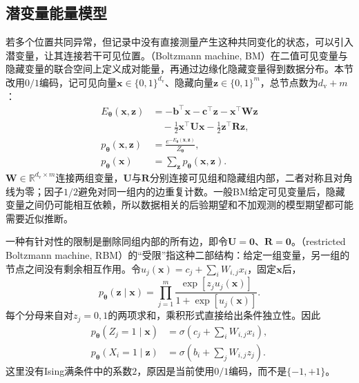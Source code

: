 \subsection{潜变量能量模型}
\label{sec:pgm-energy-models-latent}

若多个位置共同异常，但记录中没有直接测量产生这种共同变化的状态，可以引入潜变量，让其连接若干可见位置。（Boltzmann machine, BM）在二值可见变量与隐藏变量的联合空间上定义成对能量，再通过边缘化隐藏变量得到数据分布。本节改用$0/1$编码，记可见向量$\bm{x}\in\{0,1\}^{d_{\mathrm{v}}}$、隐藏向量$\bm{z}\in\{0,1\}^m$，总节点数为$d_{\mathrm{v}}+m$：
\begin{equation}
  \begin{aligned}
    E_{\bm{\theta}}(\bm{x},\bm{z})
      &=-\bm{b}^\top\bm{x}-\bm{c}^\top\bm{z}
        -\bm{x}^\top\bm{W}\bm{z}\\
      &\quad-\frac12\bm{x}^\top\bm{U}\bm{x}
             -\frac12\bm{z}^\top\bm{R}\bm{z},\\
    p_{\bm{\theta}}(\bm{x},\bm{z})
      &=\frac{e^{-E_{\bm{\theta}}(\bm{x},\bm{z})}}
               {Z_{\bm{\theta}}},\\
    p_{\bm{\theta}}(\bm{x})
      &=\sum_{\bm{z}}p_{\bm{\theta}}(\bm{x},\bm{z}).
  \end{aligned}
  \label{eq:pgm-energy-models-bm}
\end{equation}
$\bm{W}\in\mathbb{R}^{d_{\mathrm{v}}\times m}$连接两组变量，$\bm{U}$与$\bm{R}$分别连接可见组和隐藏组内部，二者对称且对角线为零；因子$1/2$避免对同一组内的边重复计数。一般BM给定可见变量后，隐藏变量之间仍可能相互依赖，所以数据相关的后验期望和不加观测的模型期望都可能需要近似推断。

一种有针对性的限制是删除同组内部的所有边，即令$\bm{U}=\bm{0}$、$\bm{R}=\bm{0}$。（restricted Boltzmann machine, RBM）的“受限”指这种二部结构：给定一组变量，另一组的节点之间没有剩余相互作用。令$u_j(\bm{x})=c_j+\sum_iW_{i,j}x_i$，固定$\bm{x}$后，
\[
  p_{\bm{\theta}}(\bm{z}\mid\bm{x})
   =\prod_{j=1}^m\frac{\exp[z_ju_j(\bm{x})]}
                         {1+\exp[u_j(\bm{x})]}.
\]
每个分母来自对$z_j=0,1$的两项求和，乘积形式直接给出条件独立性。因此
\begin{equation}
  \begin{aligned}
    p_{\bm{\theta}}(Z_j=1\mid\bm{x})
      &=\sigma\!\left(c_j+\sum_iW_{i,j}x_i\right),\\
    p_{\bm{\theta}}(X_i=1\mid\bm{z})
      &=\sigma\!\left(b_i+\sum_jW_{i,j}z_j\right).
  \end{aligned}
  \label{eq:pgm-energy-models-rbm-conditionals}
\end{equation}
这里没有Ising满条件中的系数$2$，原因是当前使用$0/1$编码，而不是$\{-1,+1\}$。

